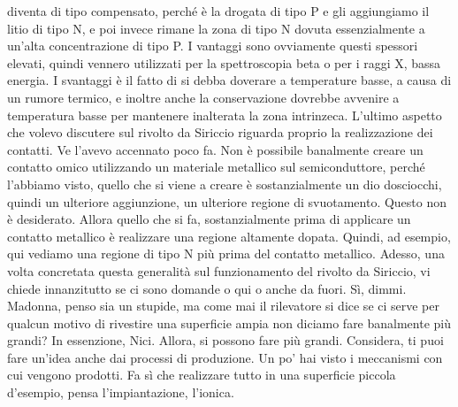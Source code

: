 {diventa di tipo compensato, perché è la drogata di tipo P e gli aggiungiamo il litio di tipo N, e poi invece rimane la zona di tipo N dovuta essenzialmente a un'alta concentrazione di tipo P. I vantaggi sono ovviamente questi spessori elevati, quindi vennero utilizzati per la spettroscopia beta o per i raggi X, bassa energia. I svantaggi è il fatto di si debba doverare a temperature basse, a causa di un rumore termico, e inoltre anche la conservazione dovrebbe avvenire a temperatura basse per mantenere inalterata la zona intrinzeca. L'ultimo aspetto che volevo discutere sul rivolto da Siriccio riguarda proprio la realizzazione dei contatti. Ve l'avevo accennato poco fa. Non è possibile banalmente creare un contatto omico utilizzando un materiale metallico sul semiconduttore, perché l'abbiamo visto, quello che si viene a creare è sostanzialmente un dio dosciocchi, quindi un ulteriore aggiunzione, un ulteriore regione di svuotamento. Questo non è desiderato. Allora quello che si fa, sostanzialmente prima di applicare un contatto metallico è realizzare una regione altamente dopata. Quindi, ad esempio, qui vediamo una regione di tipo N più prima del contatto metallico. Adesso, una volta concretata questa generalità sul funzionamento del rivolto da Siriccio, vi chiede innanzitutto se ci sono domande o qui o anche da fuori. Sì, dimmi. Madonna, penso sia un stupide, ma come mai il rilevatore si dice se ci serve per qualcun motivo di rivestire una superficie ampia non diciamo fare banalmente più grandi? In essenzione, Nici. Allora, si possono fare più grandi. Considera, ti puoi fare un'idea anche dai processi di produzione. Un po' hai visto i meccanismi con cui vengono prodotti. Fa sì che realizzare tutto in una superficie piccola d'esempio, pensa l'impiantazione, l'ionica.

}
